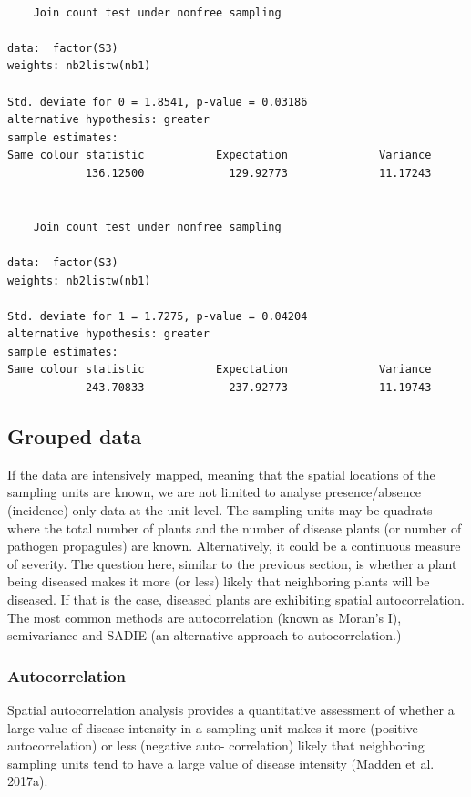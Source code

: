 \documentclass[
  letterpaper,
  DIV=11,
  numbers=noendperiod]{scrreprt}
\begin{document}
\begin{verbatim}

    Join count test under nonfree sampling

data:  factor(S3) 
weights: nb2listw(nb1) 

Std. deviate for 0 = 1.8541, p-value = 0.03186
alternative hypothesis: greater
sample estimates:
Same colour statistic           Expectation              Variance 
            136.12500             129.92773              11.17243 


    Join count test under nonfree sampling

data:  factor(S3) 
weights: nb2listw(nb1) 

Std. deviate for 1 = 1.7275, p-value = 0.04204
alternative hypothesis: greater
sample estimates:
Same colour statistic           Expectation              Variance 
            243.70833             237.92773              11.19743 
\end{verbatim}

\hypertarget{grouped-data}{%
\subsection{Grouped data}\label{grouped-data}}

If the data are intensively mapped, meaning that the spatial locations
of the sampling units are known, we are not limited to analyse
presence/absence (incidence) only data at the unit level. The sampling
units may be quadrats where the total number of plants and the number of
disease plants (or number of pathogen propagules) are known.
Alternatively, it could be a continuous measure of severity. The
question here, similar to the previous section, is whether a plant being
diseased makes it more (or less) likely that neighboring plants will be
diseased. If that is the case, diseased plants are exhibiting spatial
autocorrelation. The most common methods are autocorrelation (known as
Moran's I), semivariance and SADIE (an alternative approach to
autocorrelation.)

\hypertarget{autocorrelation}{%
\subsubsection{Autocorrelation}\label{autocorrelation}}

Spatial autocorrelation analysis provides a quantitative assessment of
whether a large value of disease intensity in a sampling unit makes it
more (positive autocorrelation) or less (negative auto- correlation)
likely that neighboring sampling units tend to have a large value of
disease intensity (Madden et al. 2017a).
\end{document}
